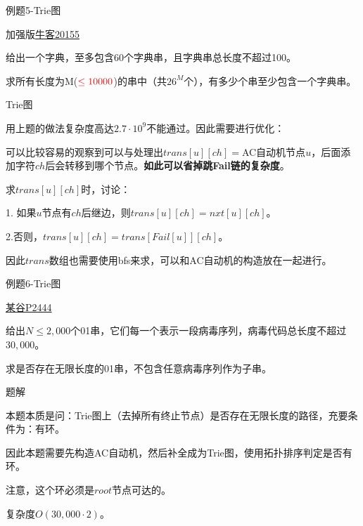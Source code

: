 \documentclass{ctexbeamer}		%
\begin{document}
\begin{frame}{例题5-Trie图}

\begin{block}{加强版\href{https://ac.nowcoder.com/acm/problem/20155}{牛客20155}}

给出一个字典，至多包含60个字典串，且字典串总长度不超过100。

求所有长度为M($\color{red}\leq 10000$)的串中（共$26^M$个），有多少个串至少包含一个字典串。

\end{block}

\pause

\begin{block}{Trie图}

用上题的做法复杂度高达$2.7 \cdot 10^9$不能通过。因此需要进行优化：

\pause

可以比较容易的观察到可以与处理出$trans[u][ch]=$AC自动机节点$u$，后面添加字符$ch$后会转移到哪个节点。\textbf{如此可以省掉跳Fail链的复杂度}。

\pause

求$trans[u][ch]$时，讨论：

1. 如果$u$节点有$ch$后继边，则$trans[u][ch] = nxt[u][ch]$。

2.否则，$trans[u][ch] = trans[Fail[u]][ch]$。

\pause

因此$trans$数组也需要使用bfs来求，可以和AC自动机的构造放在一起进行。

\end{block}
    
\end{frame}

\begin{frame}{例题6-Trie图}
    
\begin{block}{\href{https://www.luogu.com.cn/problem/P2444}{某谷P2444}}

给出$N \leq 2,000$个01串，它们每一个表示一段病毒序列，病毒代码总长度不超过$30, 000$。

求是否存在无限长度的01串，不包含任意病毒序列作为子串。

\end{block}

\pause

\begin{block}{题解}

本题本质是问：Trie图上（去掉所有终止节点）是否存在无限长度的路径，充要条件为：有环。

\pause

因此本题需要先构造AC自动机，然后补全成为Trie图，使用拓扑排序判定是否有环。

注意，这个环必须是$root$节点可达的。

复杂度$O(30, 000 \cdot 2)$。

\end{block}

\end{frame}
\end{document}
